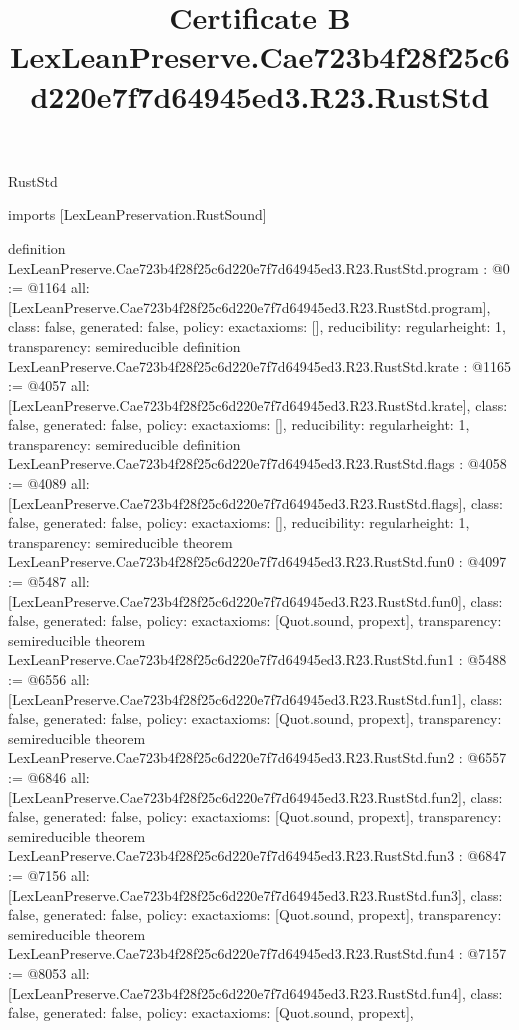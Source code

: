 \begin{lexlean}{RustStd}
\title{Certificate B LexLeanPreserve.Cae723b4f28f25c6d220e7f7d64945ed3.R23.RustStd}
\begin{coremodule}
imports [LexLeanPreservation.RustSound]

definition LexLeanPreserve.Cae723b4f28f25c6d220e7f7d64945ed3.R23.RustStd.program : @0 := @1164 {
  all: [LexLeanPreserve.Cae723b4f28f25c6d220e7f7d64945ed3.R23.RustStd.program],
  class: false,
  generated: false,
  policy: exact{axioms: []},
  reducibility: regular{height: 1},
  transparency: semireducible
}
definition LexLeanPreserve.Cae723b4f28f25c6d220e7f7d64945ed3.R23.RustStd.krate : @1165 := @4057 {
  all: [LexLeanPreserve.Cae723b4f28f25c6d220e7f7d64945ed3.R23.RustStd.krate],
  class: false,
  generated: false,
  policy: exact{axioms: []},
  reducibility: regular{height: 1},
  transparency: semireducible
}
definition LexLeanPreserve.Cae723b4f28f25c6d220e7f7d64945ed3.R23.RustStd.flags : @4058 := @4089 {
  all: [LexLeanPreserve.Cae723b4f28f25c6d220e7f7d64945ed3.R23.RustStd.flags],
  class: false,
  generated: false,
  policy: exact{axioms: []},
  reducibility: regular{height: 1},
  transparency: semireducible
}
theorem LexLeanPreserve.Cae723b4f28f25c6d220e7f7d64945ed3.R23.RustStd.fun0 : @4097 := @5487 {
  all: [LexLeanPreserve.Cae723b4f28f25c6d220e7f7d64945ed3.R23.RustStd.fun0],
  class: false,
  generated: false,
  policy: exact{axioms: [Quot.sound, propext]},
  transparency: semireducible
}
theorem LexLeanPreserve.Cae723b4f28f25c6d220e7f7d64945ed3.R23.RustStd.fun1 : @5488 := @6556 {
  all: [LexLeanPreserve.Cae723b4f28f25c6d220e7f7d64945ed3.R23.RustStd.fun1],
  class: false,
  generated: false,
  policy: exact{axioms: [Quot.sound, propext]},
  transparency: semireducible
}
theorem LexLeanPreserve.Cae723b4f28f25c6d220e7f7d64945ed3.R23.RustStd.fun2 : @6557 := @6846 {
  all: [LexLeanPreserve.Cae723b4f28f25c6d220e7f7d64945ed3.R23.RustStd.fun2],
  class: false,
  generated: false,
  policy: exact{axioms: [Quot.sound, propext]},
  transparency: semireducible
}
theorem LexLeanPreserve.Cae723b4f28f25c6d220e7f7d64945ed3.R23.RustStd.fun3 : @6847 := @7156 {
  all: [LexLeanPreserve.Cae723b4f28f25c6d220e7f7d64945ed3.R23.RustStd.fun3],
  class: false,
  generated: false,
  policy: exact{axioms: [Quot.sound, propext]},
  transparency: semireducible
}
theorem LexLeanPreserve.Cae723b4f28f25c6d220e7f7d64945ed3.R23.RustStd.fun4 : @7157 := @8053 {
  all: [LexLeanPreserve.Cae723b4f28f25c6d220e7f7d64945ed3.R23.RustStd.fun4],
  class: false,
  generated: false,
  policy: exact{axioms: [Quot.sound, propext]},
}
\end{coremodule}
\end{lexlean}
